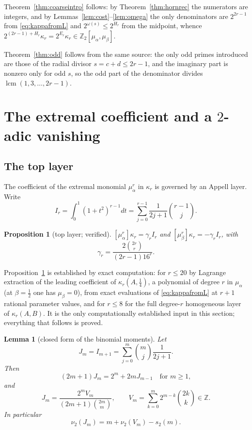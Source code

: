 \documentclass[12pt]{amsart}
\newtheorem{lemma}[theorem]{Lemma}
\newtheorem{proposition}[theorem]{Proposition}
\theoremstyle{definition}
\theoremstyle{remark}
\newcommand{\Zt}{\mathbb Z_2}
\newcommand{\ma}{\mu_\alpha}
\newcommand{\mb}{\mu_\beta}
\begin{document}
Theorem~\ref{thm:coarseintro} follows: by Theorem~\ref{thm:hornrec} the numerators are integers, and by Lemmas~\ref{lem:cost}--\ref{lem:omega} the only denominators are $2^{2r-1}$ from \eqref{eq:kappafromL} and $2^{\omega(s)}\le2^{H_r}$ from the midpoint, whence $2^{(2r-1)+H_r}\kappa_r=2^{E_r}\kappa_r\in\Zt[\ma,\mb]$.

Theorem~\ref{thm:odd} follows from the same source: the only odd primes introduced are those of the radial divisor $s=c+d\le2r-1$, and the imaginary part is nonzero only for odd $s$, so the odd part of the denominator divides $\operatorname{lcm}(1,3,\dots,2r-1)$.

\section{The extremal coefficient and a \texorpdfstring{$2$}{2}-adic vanishing}
\label{sec:extremal}

\subsection{The top layer}

The coefficient of the extremal monomial $\ma^r$ in $\kappa_r$ is governed by an Appell layer.  Write
\[
  I_r=\int_0^1(1+t^2)^{r-1}dt=\sum_{j=0}^{r-1}\frac1{2j+1}\binom{r-1}j .
\]

\begin{proposition}[top layer; verified]\label{prop:appell}
$[\ma^r]\kappa_r=\gamma_rI_r$ and $[\mb^r]\kappa_r=-\gamma_rI_r$, with 
\[
\displaystyle\gamma_r=\frac{2\binom{2r}r}{(2r-1)16^r}.
\]
\end{proposition}

Proposition~\ref{prop:appell} is established by exact computation: for $r\le20$ by Lagrange extraction of the leading coefficient of $\kappa_r(A,\tfrac14)$, a polynomial of degree $r$ in $\ma$ (at $\beta=\frac12$ one has $\mb=0$), from exact evaluations of \eqref{eq:kappafromL} at $r+1$ rational parameter values, and for $r\le8$ for the full degree-$r$ homogeneous layer of $\kappa_r(A,B)$.  It is the only computationally established input in this section; everything that follows is proved.

\begin{lemma}[closed form of the binomial moments]\label{lem:endpoint}
Let 
\[
J_m=I_{m+1}=\sum_{j=0}^{m}\binom mj\frac1{2j+1}. 
\]
Then
\[
(2m+1)J_m=2^m+2mJ_{m-1} \quad \text{for } m\ge1, 
\]
and
\[
  J_m=\frac{2^mV_m}{(2m+1)\binom{2m}m},\qquad V_m=\sum_{k=0}^m2^{m-k}\binom{2k}k\in\mathbb Z .
\]
In particular
\[
\nu_2(J_m)=m+\nu_2(V_m)-s_2(m).
\]
\end{lemma}
\end{document}
